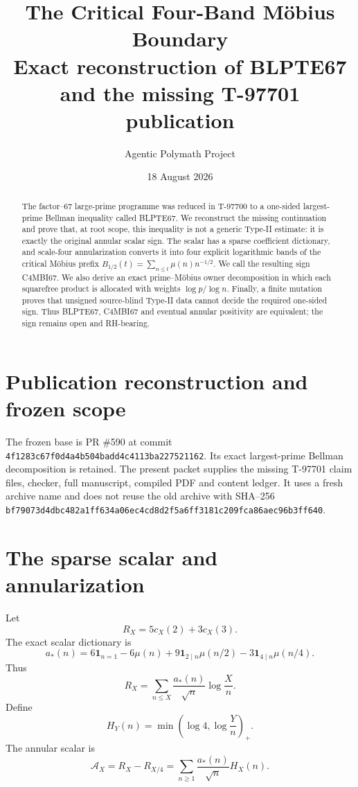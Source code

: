 \documentclass[11pt]{article}
\title{\bfseries The Critical Four-Band M\"obius Boundary\\[1mm]
\large Exact reconstruction of BLPTE67 and the missing T-97701 publication}
\author{Agentic Polymath Project}
\date{18 August 2026}
\newcommand{\one}{\mathbf 1}
\newcommand{\Acal}{\mathcal A}
\begin{document}
\maketitle
\begin{center}
\end{center}
\begin{abstract}
The factor--67 large-prime programme was reduced in T-97700 to a one-sided
largest-prime Bellman inequality called BLPTE67.  We reconstruct the missing
continuation and prove that, at root scope, this inequality is not a generic
Type-II estimate: it is exactly the original annular scalar sign.  The scalar
has a sparse coefficient dictionary, and scale-four annularization converts it
into four explicit logarithmic bands of the critical M\"obius prefix
$B_{1/2}(t)=\sum_{n\le t}\mu(n)n^{-1/2}$.  We call the resulting sign
C4MBI67.  We also derive an exact prime--M\"obius owner decomposition in which
each squarefree product is allocated with weights $\log p/\log n$.  Finally, a
finite mutation proves that unsigned source-blind Type-II data cannot decide the
required one-sided sign.  Thus BLPTE67, C4MBI67 and eventual annular positivity
are equivalent; the sign remains open and RH-bearing.
\end{abstract}
\tableofcontents

\section{Publication reconstruction and frozen scope}
The frozen base is PR \#590 at commit
\texttt{4f1283c67f0d4a4b504badd4c4113ba227521162}.  Its exact largest-prime
Bellman decomposition is retained.  The present packet supplies the missing
T-97701 claim files, checker, full manuscript, compiled PDF and content ledger.
It uses a fresh archive name and does not reuse the old archive with SHA--256
\texttt{bf79073d4dbc482a1ff634a06ec4cd8d2f5a6ff3181c209fca86aec96b3ff640}.

\section{The sparse scalar and annularization}
Let
\[
 R_X=5c_X(2)+3c_X(3).
\]
The exact scalar dictionary is
\begin{equation}\label{eq:astar}
 a_*(n)=6\one_{n=1}-6\mu(n)
 +9\one_{2\mid n}\mu(n/2)-3\one_{4\mid n}\mu(n/4).
\end{equation}
Thus
\[
 R_X=\sum_{n\le X}\frac{a_*(n)}{\sqrt n}\log\frac Xn.
\]
Define
\[
 H_Y(n)=\min\!\left(\log4,\log\frac Yn\right)_+.
\]
The annular scalar is
\begin{equation}\label{eq:annular}
 \Acal_X=R_X-R_{X/4}
 =\sum_{n\ge1}\frac{a_*(n)}{\sqrt n}H_X(n).
\end{equation}
\end{document}
